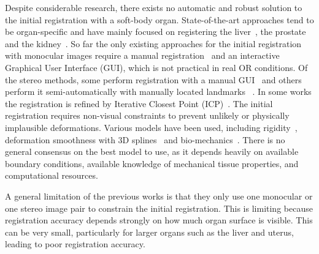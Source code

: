 Despite considerable research, there exists no automatic and robust solution to the initial registration with a soft-body organ. State-of-the-art approaches tend to be organ-specific and have mainly focused on registering the liver~\cite{haouchine13,haouchine:hal-01186011,plantefeve:hal-01205194,Robu2018,Reichard2017}, the prostate~\cite{Cohen2010Prostate} and the kidney~\cite{Su2009,nosrati2014simultaneous,affineTracking}.
So far the only existing approaches for the initial registration with monocular images require a manual registration~\cite{affineTracking} and an interactive Graphical User Interface (GUI), which is not practical in real OR conditions.
Of the stereo methods, some perform registration with a manual GUI~\cite{Cohen2010Prostate,haouchine13} and others perform it semi-automatically with manually located landmarks~\cite{21142942,conf/miccai/Amir-KhaliliNPHA13,hamarneh2014igrs,Su2009} .
In some works the registration is refined by Iterative Closest Point (ICP)~\cite{hamarneh2014igrs,Su2009}. %
The initial registration requires non-visual constraints to prevent unlikely or physically implausible deformations. Various models have been used, including rigidity~\cite{Su2009}, deformation smoothness with 3D splines~\cite{conf/miccai/Amir-KhaliliNPHA13} and bio-mechanics~\cite{hamarneh2014igrs,haouchine13,Reichard2017}.
There is no general consensus on the best model to use, as it depends heavily on available boundary conditions, available knowledge of mechanical tissue properties, and computational resources.

A general limitation of the previous works is that they only use one monocular or one stereo image pair to constrain the initial registration.
This is limiting because registration accuracy depends strongly on how much organ surface is visible. 
This can be very small, particularly for larger organs such as the liver and uterus, leading to poor registration accuracy.


